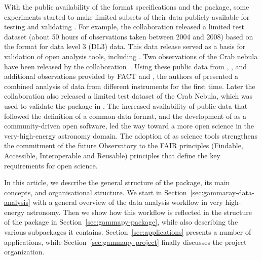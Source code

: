 \documentclass[longauth]{aa}
\begin{document}
With the public availability of the \gadf format specifications and the
\gammapy package, some experiments started to make limited subsets of
their \gammaray data publicly available for testing and validating
\gammapy. For example, the \hess collaboration released a limited test
dataset (about 50 hours of observations taken between 2004 and 2008)
based on the \gadf format \citep{HESS_DR1} for data level 3 (DL3) \gammaray data.
This data release served as a basis for validation of open analysis tools, including \gammapy 
\cite[see e.g.][]{Mohrmann2019}. Two observations of the Crab nebula have
been released by the \magic collaboration~\citep{magic_performance}.
Using these public data from \fermi, \hess, \magic and additional observations
provided by FACT and \veritas, the authors of \cite{joint_crab} presented
a combined analysis of \gammaray data from different instruments for the first time.
Later the \hawc collaboration also released a limited test dataset of the Crab Nebula,
which was used to validate the \gammapy package in \cite{Olivera2022}.
The increased availability of public data that followed the definition of
a common data format, and the development of \gammapy as a community-driven open software,
led the way toward a more open science in the very-high-energy \gammaray astronomy domain.
The adoption of \gammapy as science tools strengthens the commitment of the future \cta Observatory to the FAIR principles
(Findable, Accessible, Interoperable and Reusable) principles \citep{FAIR16, FAIR22} 
that define the key requirements for open science.

In this article, we describe the general structure of the \gammapy package,
its main concepts, and organisational structure. We start in
Section~\ref{sec:gammaray-data-analysis} with a general overview
of the data analysis workflow in very high-energy \gammaray astronomy. Then we
show how this workflow is reflected in the structure of the \gammapy package 
in Section~\ref{sec:gammapy-package}, while also
describing the various subpackages it contains. Section~\ref{sec:applications}
presents a number of applications, while Section~\ref{sec:gammapy-project}
finally discusses the project organization.
\end{document}
